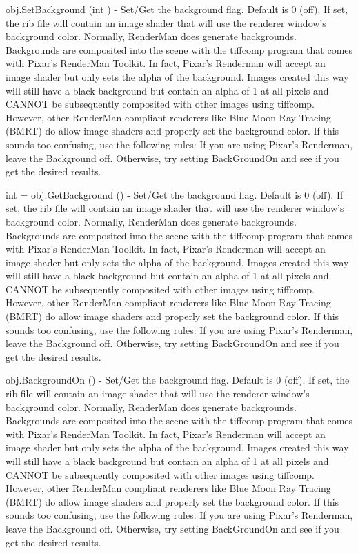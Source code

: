 \begin{DoxyItemize}
\item {\ttfamily obj.\-Set\-Background (int )} -\/ Set/\-Get the background flag. Default is 0 (off). If set, the rib file will contain an image shader that will use the renderer window's background color. Normally, Render\-Man does generate backgrounds. Backgrounds are composited into the scene with the tiffcomp program that comes with Pixar's Render\-Man Toolkit. In fact, Pixar's Renderman will accept an image shader but only sets the alpha of the background. Images created this way will still have a black background but contain an alpha of 1 at all pixels and C\-A\-N\-N\-O\-T be subsequently composited with other images using tiffcomp. However, other Render\-Man compliant renderers like Blue Moon Ray Tracing (B\-M\-R\-T) do allow image shaders and properly set the background color. If this sounds too confusing, use the following rules\-: If you are using Pixar's Renderman, leave the Background off. Otherwise, try setting Back\-Ground\-On and see if you get the desired results.  
\item {\ttfamily int = obj.\-Get\-Background ()} -\/ Set/\-Get the background flag. Default is 0 (off). If set, the rib file will contain an image shader that will use the renderer window's background color. Normally, Render\-Man does generate backgrounds. Backgrounds are composited into the scene with the tiffcomp program that comes with Pixar's Render\-Man Toolkit. In fact, Pixar's Renderman will accept an image shader but only sets the alpha of the background. Images created this way will still have a black background but contain an alpha of 1 at all pixels and C\-A\-N\-N\-O\-T be subsequently composited with other images using tiffcomp. However, other Render\-Man compliant renderers like Blue Moon Ray Tracing (B\-M\-R\-T) do allow image shaders and properly set the background color. If this sounds too confusing, use the following rules\-: If you are using Pixar's Renderman, leave the Background off. Otherwise, try setting Back\-Ground\-On and see if you get the desired results.  
\item {\ttfamily obj.\-Background\-On ()} -\/ Set/\-Get the background flag. Default is 0 (off). If set, the rib file will contain an image shader that will use the renderer window's background color. Normally, Render\-Man does generate backgrounds. Backgrounds are composited into the scene with the tiffcomp program that comes with Pixar's Render\-Man Toolkit. In fact, Pixar's Renderman will accept an image shader but only sets the alpha of the background. Images created this way will still have a black background but contain an alpha of 1 at all pixels and C\-A\-N\-N\-O\-T be subsequently composited with other images using tiffcomp. However, other Render\-Man compliant renderers like Blue Moon Ray Tracing (B\-M\-R\-T) do allow image shaders and properly set the background color. If this sounds too confusing, use the following rules\-: If you are using Pixar's Renderman, leave the Background off. Otherwise, try setting Back\-Ground\-On and see if you get the desired results.  

\end{DoxyItemize}
